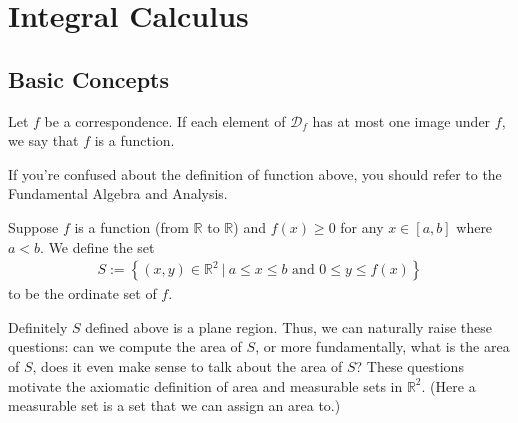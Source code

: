 \documentclass[a4paper]{ctexart}
\begin{document}
	\section{Integral Calculus}
	\subsection{Basic Concepts}
	\begin{mydef}
		Let $f$ be a correspondence. If each element of $\mathscr{D}_f$ has at most one image under $f$, we say that $f$ is a function.
	\end{mydef}
	\begin{myrmk}
		If you're confused about the definition of function above, you should refer to the Fundamental Algebra and Analysis.
	\end{myrmk}
	\begin{mydef}
		Suppose $f$ is a function (from $\mathbb{R}$ to $\mathbb{R}$) and $f(x)\ge 0$ for any $x\in \left[ a,b\right] $ where $a<b$. We define the set
		\begin{align*}
			S:=\left\{ (x,y)\in \mathbb{R}^2\ |\ a\le x \le b\text{ and } 0\le y\le f(x)\right\}
		\end{align*}
		to be the ordinate set of $f$.
	\end{mydef}
	\begin{myrmk}
		Definitely $S$ defined above is a plane region. Thus, we can naturally raise these questions: can we compute the area of $S$, or more fundamentally, what is the area of $S$, does it even make sense to talk about the area of $S$? These questions motivate the axiomatic definition of area and measurable sets in $\mathbb{R}^2$. (Here a measurable set is a set that we can assign an area to.)
	\end{myrmk}
\end{document}
